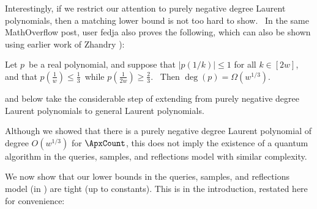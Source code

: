 Interestingly, if we restrict our attention to purely negative degree
Laurent polynomials, then a matching lower bound is not too hard to show. \
In the same MathOverflow post, user fedja also proves the following, which can also
be shown using earlier work of Zhandry \cite[Proof of Theorem 7.3]{zhandry}):

\begin{lemma}
\label{fedjalem}Let $p$\ be a real polynomial, and suppose that $\left\vert
p\left( 1/k\right) \right\vert \leq1$ for all $k\in\left[ 2w\right] $, and
that $p\left( \frac{1}{w}\right) \leq\frac{1}{3}$\ while $p\left( \frac{1}{2w
}\right) \geq\frac{2}{3}$. \ Then $\deg\left( p\right) =\Omega\left(
w^{1/3}\right) $.
\end{lemma}

 and  below take the considerable step of
extending \Cref{fedjalem} from purely negative degree Laurent
polynomials to general Laurent polynomials.


Although we showed that there is a purely negative degree Laurent polynomial of degree
$O(w^{1/3})$ for $\ApxCount$, this does not imply the existence of a quantum algorithm
in the queries, samples, and reflections model with similar complexity.

We now show that our lower bounds in the queries, samples, and reflections model (in ) are tight (up to constants). This is  in the introduction, restated here for convenience:

\alg*

